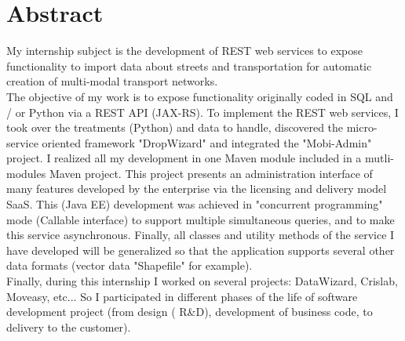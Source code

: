 \chapter*{Abstract}

My internship subject is the development of REST web services to expose functionality to import data about streets and transportation for automatic creation of multi-modal transport networks.\\

The objective of my work is to expose functionality originally coded in SQL and / or Python via a REST API (JAX-RS). To implement the REST web services, I took over the treatments (Python) and data to handle, discovered the micro-service oriented framework "DropWizard" and integrated the "Mobi-Admin" project. I realized all my development in one Maven module included in a mutli-modules Maven project. This project presents an administration interface of many features developed by the enterprise via the licensing and delivery model SaaS. This (Java EE) development was achieved in "concurrent programming" mode (Callable interface) to support multiple simultaneous queries, and to make this service asynchronous. Finally, all classes and utility methods of the service I have developed will be generalized so that the application supports several other data formats (vector data "Shapefile" for example).\\

Finally, during this internship I worked on several projects: DataWizard, Crislab, Moveasy, etc... So I participated in different phases of the life of software development project (from design ( R\&D), development of business code, to delivery to the customer).\\